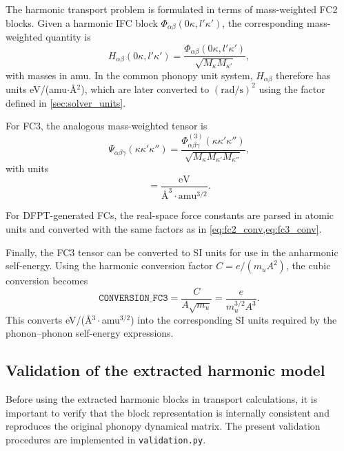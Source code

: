 The harmonic transport problem is formulated in terms of mass-weighted
FC2 blocks.  Given a harmonic IFC block
$\Phi_{\alpha\beta}(0\kappa,l'\kappa')$, the corresponding mass-weighted
quantity is
\begin{equation}
  H_{\alpha\beta}(0\kappa,l'\kappa')
  = \frac{\Phi_{\alpha\beta}(0\kappa,l'\kappa')}
         {\sqrt{M_\kappa M_{\kappa'}}},
\end{equation}
with masses in amu.  In the common phonopy unit system,
$H_{\alpha\beta}$ therefore has units
eV/(amu$\cdot$\AA$^2$), which are later converted to
$(\mathrm{rad/s})^2$ using the factor defined in
\cref{sec:solver_units}.

For FC3, the analogous mass-weighted tensor is
\begin{equation}\label{eq:fc3_mw}
  \Psi_{\alpha\beta\gamma}(\kappa\kappa'\kappa'')
  = \frac{\Phi^{(3)}_{\alpha\beta\gamma}(\kappa\kappa'\kappa'')}
         {\sqrt{M_\kappa M_{\kappa'} M_{\kappa''}}},
\end{equation}
with units
\begin{equation}
  [\Psi]
  = \frac{\mathrm{eV}}
         {\text{\AA}^3\cdot\mathrm{amu}^{3/2}}.
\end{equation}

For DFPT-generated FCs, the real-space force constants are parsed in
atomic units and converted with the same factors as in
\cref{eq:fc2_conv,eq:fc3_conv}.

Finally, the FC3 tensor can be converted to SI units for use in the
anharmonic self-energy.  Using the harmonic conversion factor
$C = e/(m_u A^2)$, the cubic conversion becomes
\begin{equation}\label{eq:conversion_fc3_ifc}
  \texttt{CONVERSION\_FC3}
  = \frac{C}{A\sqrt{m_u}}
  = \frac{e}{m_u^{3/2} A^3}.
\end{equation}
This converts
eV/(\AA$^3\cdot$amu$^{3/2}$) into the corresponding SI units required
by the phonon--phonon self-energy expressions.

\subsection{Validation of the extracted harmonic model}
\label{sec:extraction_validation}

Before using the extracted harmonic blocks in transport calculations, it
is important to verify that the block representation is internally
consistent and reproduces the original phonopy dynamical matrix.  The
present validation procedures are implemented in
\texttt{validation.py}.


